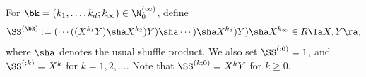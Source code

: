 \begin{Definition}
\label{demi-shuffle}
For $\bk=(k_1,\dots,k_d; k_\infty)\in\N_0^{(\infty)}$, define
$$
\SS^{(\bk)}:=
(\cdots((X^{k_1}Y)\sha X^{k_2})Y)\sha\cdots)\sha  X^{k_d})Y)\sha
X^{k_\infty} \in R\la X,Y\ra,
$$
where $\sha$ denotes the usual shuffle product. 
We also set $\SS^{(;0)}=1$, and $\SS^{(;k)}=X^k$ for $k=1,2,\dots$.
Note that $\SS^{(k;0)}=X^kY$ for $k\ge 0$.
\end{Definition}
